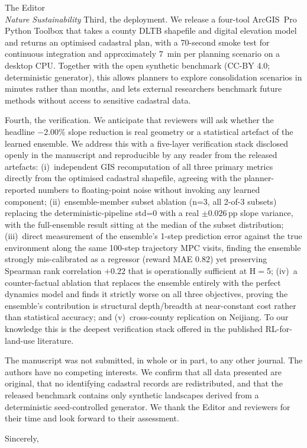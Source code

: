 \documentclass[11pt]{letter}
\begin{document}
\begin{letter}{The Editor \\ \textit{Nature Sustainability}}
Third, the deployment. We release a four-tool ArcGIS~Pro Python Toolbox that takes a county DLTB shapefile and digital elevation model and returns an optimised cadastral plan, with a 70-second smoke test for continuous integration and approximately $7$~min per planning scenario on a desktop CPU. Together with the open synthetic benchmark (CC-BY 4.0; deterministic generator), this allows planners to explore consolidation scenarios in minutes rather than months, and lets external researchers benchmark future methods without access to sensitive cadastral data.

Fourth, the verification. We anticipate that reviewers will ask whether the headline $-2.00\%$ slope reduction is real geometry or a statistical artefact of the learned ensemble. We address this with a five-layer verification stack disclosed openly in the manuscript and reproducible by any reader from the released artefacts: (i)~independent GIS recomputation of all three primary metrics directly from the optimised cadastral shapefile, agreeing with the planner-reported numbers to floating-point noise without invoking any learned component; (ii)~ensemble-member subset ablation (n=3, all 2-of-3 subsets) replacing the deterministic-pipeline std=0 with a real $\pm 0.026$\,pp slope variance, with the full-ensemble result sitting at the median of the subset distribution; (iii)~direct measurement of the ensemble's 1-step prediction error against the true environment along the same 100-step trajectory MPC visits, finding the ensemble strongly mis-calibrated as a regressor (reward MAE $0.82$) yet preserving Spearman rank correlation $+0.22$ that is operationally sufficient at H$=$5; (iv)~a counter-factual ablation that replaces the ensemble entirely with the perfect dynamics model and finds it strictly worse on all three objectives, proving the ensemble's contribution is structural depth/breadth at near-constant cost rather than statistical accuracy; and (v)~cross-county replication on Neijiang. To our knowledge this is the deepest verification stack offered in the published RL-for-land-use literature.

The manuscript was not submitted, in whole or in part, to any other journal. The authors have no competing interests. We confirm that all data presented are original, that no identifying cadastral records are redistributed, and that the released benchmark contains only synthetic landscapes derived from a deterministic seed-controlled generator. We thank the Editor and reviewers for their time and look forward to their assessment.

\closing{Sincerely,}

\end{letter}
\end{document}
